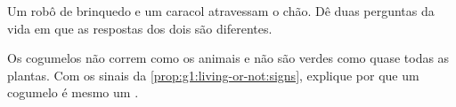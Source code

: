 \begin{exercise}[$\star\star$]\label{exo:g1:living-or-not:9}
Um robô de brinquedo e um caracol atravessam o chão. Dê duas
perguntas da vida em que as respostas dos dois são diferentes.
\end{exercise}

\begin{exercise}[$\star\star$]\label{exo:g1:living-or-not:10}
Os cogumelos não correm como os animais e não são verdes como quase
todas as plantas. Com os sinais da \cref{prop:g1:living-or-not:signs},
explique por que um cogumelo é mesmo um .
\end{exercise}
